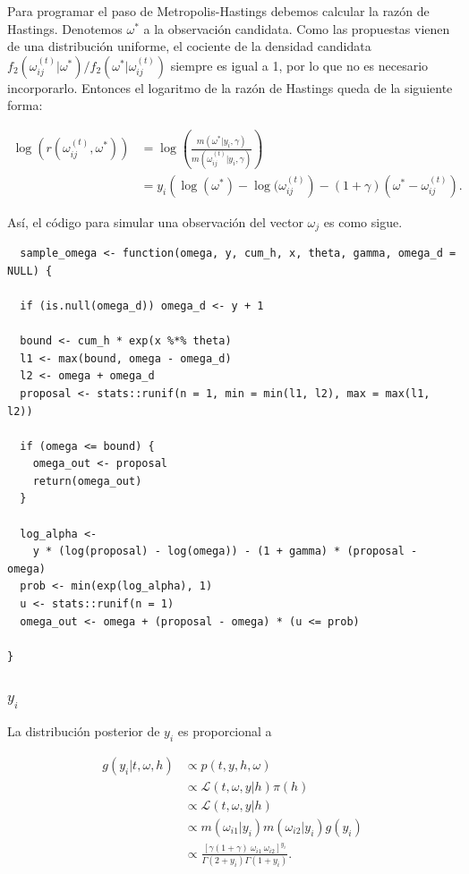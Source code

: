\documentclass[11pt,a4paper]{article}
\begin{document}
Para programar el paso de Metropolis-Hastings debemos calcular la razón de Hastings. Denotemos $\omega^*$ a la observación candidata. Como las propuestas vienen de una distribución uniforme, el cociente de la densidad candidata $f_2(\omega_{ij} ^{(t)} | \omega^*)/f_2(\omega^* | \omega_{ij} ^{(t)})$ siempre es igual a 1, por lo que no es necesario incorporarlo. Entonces el logaritmo de la razón de Hastings queda de la siguiente forma:

\begin{align*}
\log (r(\omega_{ij}^{(t)}, \omega^*)) &= \log \left(\frac{m(\omega^* | y_i, \gamma)}{m(\omega_{ij}^{(t)}| y_i, \gamma)}\right)\\
&= y_i \left(\log (\omega^*) - \log (\omega_{ij}^{(t)}\right) - (1 + \gamma)(\omega^* - \omega_{ij}^{(t)}).
\end{align*}

Así, el código para simular una observación del vector $\omega_j$ es como sigue.\\

\begin{lstlisting}
  sample_omega <- function(omega, y, cum_h, x, theta, gamma, omega_d = NULL) {

  if (is.null(omega_d)) omega_d <- y + 1

  bound <- cum_h * exp(x %*% theta)
  l1 <- max(bound, omega - omega_d)
  l2 <- omega + omega_d
  proposal <- stats::runif(n = 1, min = min(l1, l2), max = max(l1, l2))

  if (omega <= bound) {
    omega_out <- proposal
    return(omega_out)
  }

  log_alpha <-
    y * (log(proposal) - log(omega)) - (1 + gamma) * (proposal - omega)
  prob <- min(exp(log_alpha), 1)
  u <- stats::runif(n = 1)
  omega_out <- omega + (proposal - omega) * (u <= prob)

}
\end{lstlisting}


\subsubsection{$y_i$}
\label{posterior_y}

La distribución posterior de $y_i$ es proporcional a

\begin{align*}
g(y_i | t, \omega, h) &\propto p(t, y, h, \omega)\\
&\propto \mathcal{L}(t, \omega, y |h) \pi(h)\\
&\propto \mathcal{L}(t, \omega, y |h)\\
&\propto m(\omega_{i1}|y_i)m(\omega_{i2}|y_i)g(y_i)\\
&\propto \frac{\left[\gamma (1+\gamma) \ \omega_{i1} \ \omega_{i2}\right]^{y_i}}{\Gamma(2+y_i)\Gamma(1+y_i)}.
\end{align*}
\end{document}
